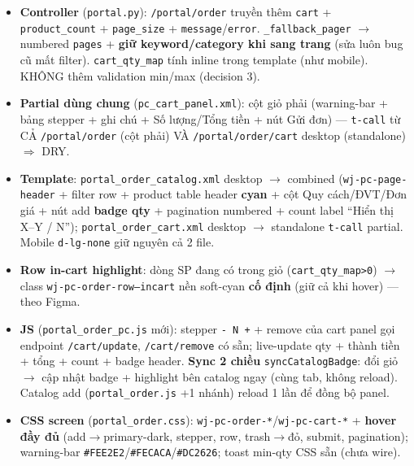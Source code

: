 \begin{itemize}
  \item \textbf{Controller} (\texttt{portal.py}): \texttt{/portal/order} truyền thêm \texttt{cart} +
        \texttt{product\_count} + \texttt{page\_size} + \texttt{message}/\texttt{error}.
        \texttt{\_fallback\_pager} \(\rightarrow\) numbered \texttt{pages} + \textbf{giữ
        keyword/category khi sang trang} (sửa luôn bug cũ mất filter). \texttt{cart\_qty\_map} tính
        inline trong template (như mobile). KHÔNG thêm validation min/max (decision 3).
  \item \textbf{Partial dùng chung} (\texttt{pc\_cart\_panel.xml}): cột giỏ phải (warning-bar + bảng
        stepper + ghi chú + Số lượng/Tổng tiền + nút Gửi đơn) --- \texttt{t-call} từ CẢ
        \texttt{/portal/order} (cột phải) VÀ \texttt{/portal/order/cart} desktop (standalone) \(\Rightarrow\) DRY.
  \item \textbf{Template}: \texttt{portal\_order\_catalog.xml} desktop \(\rightarrow\) combined
        (\texttt{wj-pc-page-header} + filter row + product table header \textbf{cyan} + cột Quy
        cách/ĐVT/Đơn giá + nút add \textbf{badge qty} + pagination numbered + count label
        ``Hiển thị X--Y / N''); \texttt{portal\_order\_cart.xml} desktop \(\rightarrow\) standalone
        \texttt{t-call} partial. Mobile \texttt{d-lg-none} giữ nguyên cả 2 file.
  \item \textbf{Row in-cart highlight}: dòng SP đang có trong giỏ (\texttt{cart\_qty\_map>0})
        \(\rightarrow\) class \texttt{wj-pc-order-row--incart} nền soft-cyan \textbf{cố định} (giữ cả
        khi hover) --- theo Figma.
  \item \textbf{JS} (\texttt{portal\_order\_pc.js} mới): stepper \texttt{- N +} + remove của cart panel
        gọi endpoint \texttt{/cart/update}, \texttt{/cart/remove} có sẵn; live-update qty + thành tiền +
        tổng + count + badge header. \textbf{Sync 2 chiều} \texttt{syncCatalogBadge}: đổi giỏ
        \(\rightarrow\) cập nhật badge + highlight bên catalog ngay (cùng tab, không reload). Catalog
        add (\texttt{portal\_order.js} +1 nhánh) reload 1 lần để đồng bộ panel.
  \item \textbf{CSS screen} (\texttt{portal\_order.css}): \texttt{wj-pc-order-*}/\texttt{wj-pc-cart-*} +
        \textbf{hover đầy đủ} (add\(\rightarrow\)primary-dark, stepper, row, trash\(\rightarrow\)đỏ,
        submit, pagination); warning-bar \texttt{\#FEE2E2}/\texttt{\#FECACA}/\texttt{\#DC2626}; toast
        min-qty CSS sẵn (chưa wire).
\end{itemize}

